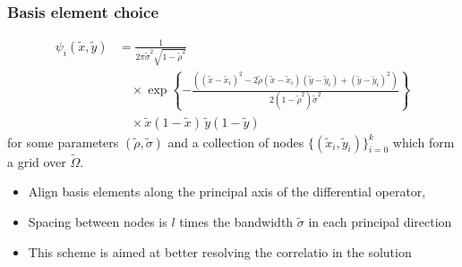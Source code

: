 \documentclass{beamer}
\begin{document}
\begin{frame}
  \frametitle{Basis element choice}
  \begin{align*}
    \psi_i(\tilde{x},\tilde{y}) &= \frac{1}{2\pi \tilde{\sigma}^2\sqrt{1-\tilde{\rho}^2} } \\
                                &\quad \times \exp\left\{ -\frac{\left( (\tilde{x} - \tilde{x}_i)^2 - 2\tilde{\rho} (\tilde{x}-\tilde{x}_i)(\tilde{y}-\tilde{y}_i) + (\tilde{y} - \tilde{y}_i)^2 \right)}{2(1-\tilde{\rho}^2)\tilde{\sigma}^2}  \right\} \nonumber \\
                                &\quad \times \tilde{x}\left(1-\tilde{x}\right)\, \tilde{y}(1-\tilde{y}) \nonumber
  \end{align*}
  for some parameters $(\tilde{\rho}, \tilde{\sigma})$ and a collection of nodes
  $\{ (\tilde{x}_i,\tilde{y}_i) \}_{i=0}^k$ which form a grid over
  $\tilde{\Omega}$.
  \begin{itemize}
  \item Align basis elements along the principal axis of the differential operator,
  \item Spacing between nodes is $l$ times the bandwidth $\tilde{\sigma}$ in each principal direction
  \item This scheme is aimed at better resolving the correlatio in the solution
  \end{itemize}
\end{frame}
\end{document}
